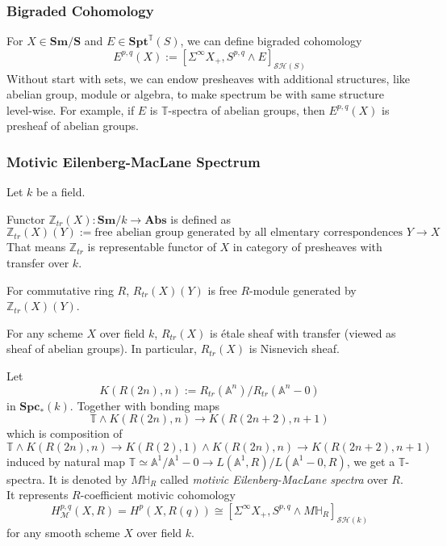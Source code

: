 \documentclass[b5paper,10pt]{article}
\begin{document}
\subsubsection{Bigraded Cohomology}
For $X \in \mathbf{Sm/S}$ and $E \in \mathbf{Spt}^{\mathbb{T}}(S)$, we can define bigraded cohomology
\[
E^{p,q}(X):= [\Sigma^{\infty}X_{+}, S^{p,q}\wedge E]_{\mathcal{SH}(S)}
\]
Without start with sets, we can endow presheaves with additional structures, like abelian group, module or algebra, to make spectrum be with same structure level-wise. For example, if $E$ is $\mathbb{T}$-spectra of abelian groups, then $E^{p,q}(X)$ is presheaf of abelian groups.
\subsubsection{Motivic Eilenberg-MacLane Spectrum}
Let $k$ be a field.
\begin{secdefn}
	Functor $\mathbb{Z}_{tr}(X) \colon \mathbf{Sm}/k \to \mathbf{Abs}$ is defined as
	\[
	\mathbb{Z}_{tr}(X)(Y) := \text{free abelian group generated by all elmentary correspondences } Y \to X
	\]
	That means $\mathbb{Z}_{tr}$ is representable functor of $X$ in category of presheaves with transfer over $k$.
	
	For commutative ring $R$, $R_{tr}(X)(Y)$ is free $R$-module generated by $\mathbb{Z}_{tr}(X)(Y)$.
\end{secdefn}
\begin{secprop}
	For any scheme $X$ over field $k$, $R_{tr}(X)$ is \'etale sheaf with transfer (viewed as sheaf of abelian groups). In particular, $R_{tr}(X)$ is Nisnevich sheaf.
\end{secprop}
Let 
\[
K(R(2n),n):= R_{tr}(\mathbb{A}^n)/R_{tr}(\mathbb{A}^n-0)
\]
in $\mathbf{Spc}_*(k)$. Together with bonding maps
\[
\mathbb{T} \wedge K(R(2n),n) \to K(R(2n+2),n+1)
\]
which is composition of 
\[
\mathbb{T} \wedge K(R(2n),n) \to K(R(2),1) \wedge K(R(2n),n) \to K(R(2n+2),n+1)
\]
induced by natural map $\mathbb{T} \simeq \mathbb{A}^1/\mathbb{A}^1-0 \to L(\mathbb{A}^1,R)/L(\mathbb{A}^1-0,R)$, we get a $\mathbb{T}$-spectra. It is denoted by $M\mathbb{H}_R$ called \emph{motivic Eilenberg-MacLane spectra} over $R$. It represents $R$-coefficient motivic cohomology
\[
H^{p,q}_\mathcal{M}(X,R)= H^p(X,R(q)) \cong [\Sigma^{\infty}X_{+}, S^{p,q}\wedge M\mathbb{H}_R]_{\mathcal{SH}(k)}
\]
for any smooth scheme $X$ over field $k$.
\end{document}
